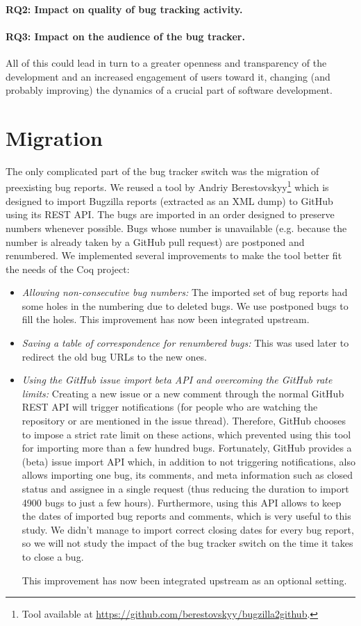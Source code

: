 \documentclass[conference]{IEEEtran}
\begin{document}
\paragraph{RQ2: Impact on quality of bug tracking activity.}
\paragraph{RQ3: Impact on the audience of the bug tracker.}

All of this could lead in turn to a greater openness and transparency of the development and an increased engagement of users toward it, changing (and probably improving) the dynamics of a crucial part of software development. 

\section{Migration}
\label{migration}

The only complicated part of the bug tracker switch was the migration of preexisting bug reports. We reused a tool by Andriy Berestovskyy\footnote{Tool available at \url{https://github.com/berestovskyy/bugzilla2github}.} which is designed to import Bugzilla reports (extracted as an XML dump) to GitHub using its REST API. The bugs are imported in an order designed to preserve numbers whenever possible. Bugs whose number is unavailable (e.g. because the number is already taken by a GitHub pull request) are postponed and renumbered. We implemented several improvements to make the tool better fit the needs of the Coq project:
\begin{itemize}
\item \textit{Allowing non-consecutive bug numbers:} The imported set of bug reports had some holes in the numbering due to deleted bugs. We use postponed bugs to fill the holes. This improvement has now been integrated upstream.
\item \textit{Saving a table of correspondence for renumbered bugs:} This was used later to redirect the old bug URLs to the new ones.
\item \textit{Using the GitHub issue import beta API and overcoming the GitHub rate limits:} Creating a new issue or a new comment through the normal GitHub REST API will trigger notifications (for people who are watching the repository or are mentioned in the issue thread). Therefore, GitHub chooses to impose a strict rate limit on these actions, which prevented using this tool for importing more than a few hundred bugs. Fortunately, GitHub provides a (beta) issue import API which, in addition to not triggering notifications, also allows importing one bug, its comments, and meta information such as closed status and assignee in a single request (thus reducing the duration to import 4900 bugs to just a few hours). Furthermore, using this API allows to keep the dates of imported bug reports and comments, which is very useful to this study. We didn't manage to import correct closing dates for every bug report, so we will not study the impact of the bug tracker switch on the time it takes to close a bug.

This improvement has now been integrated upstream as an optional setting.
\end{itemize}
\end{document}
